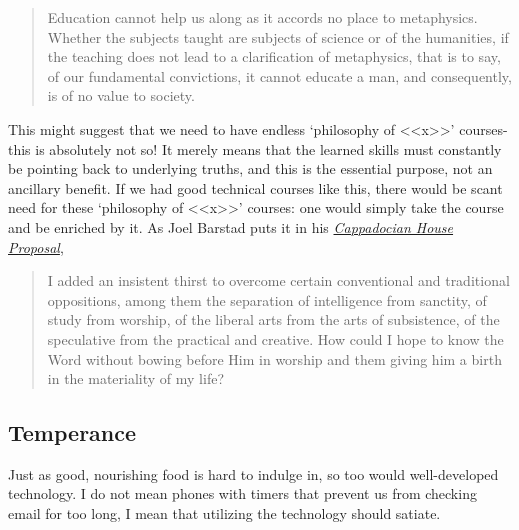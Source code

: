 \documentclass[letterpaper]{article}
\begin{document}
\begin{quote}
  Education cannot help us along as it accords no place to metaphysics. Whether the subjects taught are subjects of science or of the humanities, if the teaching does not lead to a clarification of metaphysics, that is to say, of our fundamental convictions, it cannot educate a man, and consequently, is of no value to society.
\end{quote}

This might suggest that we need to have endless `philosophy of <<x>>' courses- this is absolutely not so! It merely means that the learned skills must constantly be pointing back to underlying truths, and this is the essential purpose, not an ancillary benefit. If we had good technical courses like this, there would be scant need for these `philosophy of <<x>>' courses: one would simply take the course and be enriched by it. As Joel Barstad puts it in his \href{https://byzantinela.com/cappadocian-house-proposal/}{\textit{Cappadocian House Proposal}},

\begin{quote}
  I added an insistent thirst to overcome certain conventional and traditional oppositions, among them the separation of intelligence from sanctity, of study from worship, of the liberal arts from the arts of subsistence, of the speculative from the practical and creative. How could I hope to know the Word without bowing before Him in worship and them giving him a birth in the materiality of my life?
\end{quote}


\subsection{Temperance}

Just as good, nourishing food is hard to indulge in, so too would well-developed technology. I do not mean phones with timers that prevent us from checking email for too long, I mean that utilizing the technology should satiate.

\hfill

\hfill

\hfill
\end{document}
